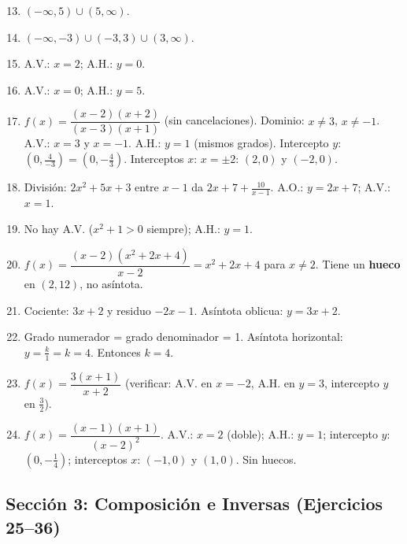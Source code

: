 \documentclass[12pt, a4paper]{article}
\begin{document}
\begin{enumerate}[leftmargin=*, label=\textbf{\arabic*.}]
  \setcounter{enumi}{12}
  \item $(-\infty, 5) \cup (5, \infty)$.

  \item $(-\infty, -3) \cup (-3, 3) \cup (3, \infty)$.

  \item A.V.: $x = 2$; A.H.: $y = 0$.

  \item A.V.: $x = 0$; A.H.: $y = 5$.

  \item $f(x) = \dfrac{(x - 2)(x + 2)}{(x - 3)(x + 1)}$ (sin cancelaciones). Dominio: $x \neq 3$, $x \neq -1$. A.V.: $x = 3$ y $x = -1$. A.H.: $y = 1$ (mismos grados). Intercepto $y$: $(0, \frac{4}{-3}) = (0, -\frac{4}{3})$. Interceptos $x$: $x = \pm 2$: $(2, 0)$ y $(-2, 0)$.

  \item División: $2x^2 + 5x + 3$ entre $x - 1$ da $2x + 7 + \frac{10}{x - 1}$. A.O.: $y = 2x + 7$; A.V.: $x = 1$.

  \item No hay A.V. ($x^2 + 1 > 0$ siempre); A.H.: $y = 1$.

  \item $f(x) = \dfrac{(x - 2)(x^2 + 2x + 4)}{x - 2} = x^2 + 2x + 4$ para $x \neq 2$. Tiene un \textbf{hueco} en $(2, 12)$, no asíntota.

  \item Cociente: $3x + 2$ y residuo $-2x - 1$. Asíntota oblicua: $y = 3x + 2$.

  \item Grado numerador = grado denominador = 1. Asíntota horizontal: $y = \frac{k}{1} = k = 4$. Entonces $k = 4$.

  \item $f(x) = \dfrac{3(x + 1)}{x + 2}$ (verificar: A.V. en $x = -2$, A.H. en $y = 3$, intercepto $y$ en $\frac{3}{2}$).

  \item $f(x) = \dfrac{(x - 1)(x + 1)}{(x - 2)^2}$. A.V.: $x = 2$ (doble); A.H.: $y = 1$; intercepto $y$: $(0, -\frac{1}{4})$; interceptos $x$: $(-1, 0)$ y $(1, 0)$. Sin huecos.
\end{enumerate}

\newpage

\subsection*{Sección 3: Composición e Inversas (Ejercicios 25--36)}
\end{document}
